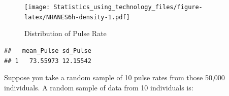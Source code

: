 \documentclass[]{book}
\newenvironment{Shaded}{\begin{snugshade}}{\end{snugshade}}
\newcommand{\DataTypeTok}[1]{\textcolor[rgb]{0.13,0.29,0.53}{#1}}
\newcommand{\DecValTok}[1]{\textcolor[rgb]{0.00,0.00,0.81}{#1}}
\newcommand{\KeywordTok}[1]{\textcolor[rgb]{0.13,0.29,0.53}{\textbf{#1}}}
\newcommand{\NormalTok}[1]{#1}
\newcommand{\OperatorTok}[1]{\textcolor[rgb]{0.81,0.36,0.00}{\textbf{#1}}}
\newcommand{\StringTok}[1]{\textcolor[rgb]{0.31,0.60,0.02}{#1}}
\begin{document}
\begin{figure}
\centering
\texttt{[image: Statistics\_using\_technology\_files/figure-latex/NHANES6h-density-1.pdf]}
\caption{\label{fig:NHANES6h-density}Distribution of Pulse Rate}
\end{figure}

\begin{verbatim}
##   mean_Pulse sd_Pulse
## 1   73.55973 12.15542
\end{verbatim}

Suppose you take a random sample of 10 pulse rates from those 50,000 individuals. A random sample of data from 10 individuals is:

\begin{Shaded}
\end{Shaded}
\end{document}
